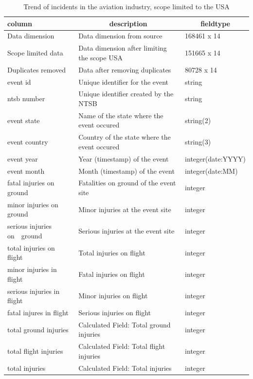 \documentclass[
  man,floatsintext]{apa7}
\begin{document}
\begin{table}[tbp]

\begin{center}
\begin{threeparttable}

\caption{\label{tab:aviation-incidents-schema}Trend of incidents in the aviation industry, scope limited to the USA}

\begin{tabular}{lll}
\toprule
column & \multicolumn{1}{c}{description} & \multicolumn{1}{c}{fieldtype}\\
\midrule
Data dimension & Data dimension from source & 168461 x 14\\
Scope limited data & Data dimension after limiting the scope USA & 151665 x 14\\
Duplicates removed & Data after removing duplicates & 80728 x 14\\
event id & Unique identifier for the event & string\\
ntsb number & Unique identifier created by the NTSB & string\\
event state & Name of the state where the event occured & string(2)\\
event country & Country of the state where the event occured & string(3)\\
event year & Year (timestamp) of the event & integer(date:YYYY)\\
event month & Month (timestamp) of the event & integer(date:MM)\\
fatal injuries on ground & Fatalities on ground of the event site & integer\\
minor injuries on ground & Minor injuries at the event site & integer\\
serious injuries on\ \ ground & Serious injuries at the event site & integer\\
total injuries on flight & Total injuries on flight & integer\\
minor injuries in flight & Fatal injuries on flight & integer\\
serious injuries in flight & Minor injuries on flight & integer\\
fatal injures in flight & Serious injuries on flight & integer\\
total ground injuries & Calculated Field: Total ground injuries & integer\\
total flight injuries & Calculated Field: Total flight injuries & integer\\
total injuries & Calculated Field: Total injuries & integer\\
\bottomrule
\end{tabular}

\end{threeparttable}
\end{center}

\end{table}
\end{document}
